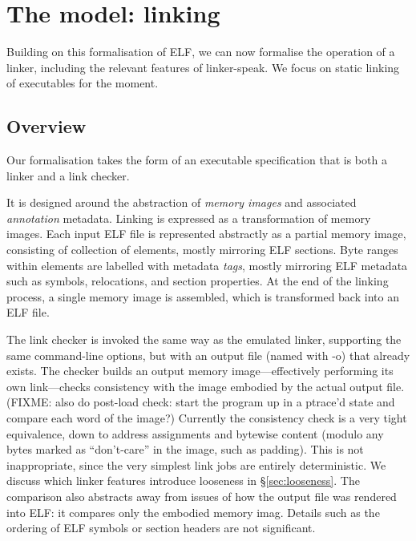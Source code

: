 \section{The model: linking}

Building on this formalisation of ELF, we can now formalise the operation of a linker,
including the relevant features of linker-speak.
We focus on static linking of executables for the moment.

\subsection{Overview}

Our formalisation takes the form of an executable specification that 
is both a linker and a link checker.

It is designed around the abstraction of \emph{memory images} and associated \emph{annotation} metadata.
Linking is expressed as a transformation of memory images.
Each input ELF file is represented abstractly as a partial memory image, consisting of 
collection of elements, mostly mirroring ELF sections.
Byte ranges within elements are labelled with metadata \emph{tags}, 
mostly mirroring ELF metadata such as symbols, relocations, and section properties.
At the end of the linking process, a single memory image is assembled,
which is transformed back into an ELF file.

The link checker is invoked the same way as the emulated linker, supporting the same command-line options,
but with an output file (named with \textsf{-o}) that already exists.
The checker builds an output memory image---effectively performing its own link---checks consistency with the image
embodied by the actual output file.
(FIXME: also do post-load check: start the program up in a ptrace'd state 
and compare each word of the image?)
Currently the consistency check is a very tight equivalence, down to address assignments and bytewise content
(modulo any bytes marked as ``don't-care'' in the image, such as padding).
This is not inappropriate, since the very simplest link jobs are entirely deterministic.
We discuss which linker features introduce looseness in \S\ref{sec:looseness}.
The comparison also abstracts away from issues of how the output file was rendered into ELF: 
it compares only the embodied memory imag. 
Details such as the ordering of ELF symbols or section headers are not significant.

